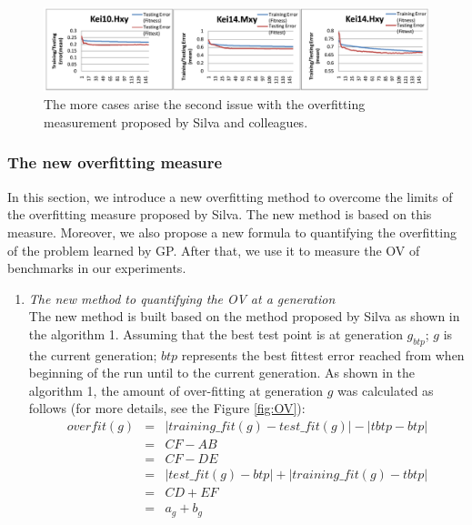 \begin{enumerate}
\begin{figure}
\centering
\includegraphics[scale=0.4]{Figures/Fig3_3.png}
\caption{The more cases arise the second issue with the overfitting measurement proposed by Silva and colleagues.}
\label{fig:issue2.2}       %
\end{figure}


\subsubsection{The new overfitting measure}
In this section, we introduce a new overfitting method to overcome the limits of the overfitting measure proposed by Silva. The new method is based on this measure. Moreover, we also propose a new formula to quantifying the overfitting of the problem learned by GP. After that, we use it to measure the OV of benchmarks in our experiments. 
\begin{enumerate}
\item \textit{The new method to quantifying the OV at a generation}\\
The new method is built based on the method proposed by Silva as shown in the algorithm 1. Assuming that the best test point is at generation ${g}_{btp}$; $g$ is the current generation; $btp$ represents the best fittest error reached from when beginning of the  run until to the current generation. As shown in the algorithm 1, the amount of over-fitting at generation $g$ was calculated as follows (for more details, see the Figure \ref{fig:OV}):
\begin{eqnarray}
overfit(g)&=&{|training\_fit(g)-test\_fit(g)| - |tbtp-btp|} \nonumber\\
		  &=& {CF-AB}	\nonumber\\
          &=& {CF-DE}	\nonumber\\
		  &=& {|test\_fit(g) - btp|+|training\_fit(g)- tbtp|} \nonumber\\
		  &=& {CD+EF}  \nonumber\\
		  &=& {a_{g}+b_{g}}  \nonumber\\
\end{eqnarray}


\end{enumerate}
\end{enumerate}
